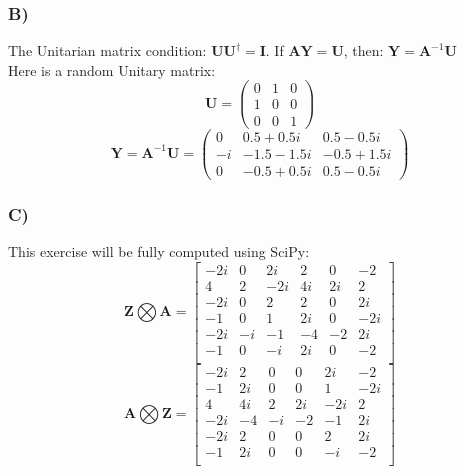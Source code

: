 \documentclass{article}
\begin{document}
            \subsubsection*{B)}
                The Unitarian matrix condition: $\mathbf{UU^{\dagger}} = \mathbf{I}$. If $\mathbf{AY} = \mathbf{U}$, then: $\mathbf{Y} = \mathbf{A}^{-1}\mathbf{U}$ \\
                Here is a random Unitary matrix:
                \[
                    \mathbf{U} = \begin{pmatrix}
                        0 & 1 & 0 \\
                        1 & 0 & 0 \\
                        0 & 0 & 1
                    \end{pmatrix}
                \]
                \[
                    \mathbf{Y} = \mathbf{A}^{-1}\mathbf{U} = 
                    \begin{pmatrix}
                    0 & 0.5 + 0.5i & 0.5 - 0.5i \\
                    -i & -1.5 - 1.5i & -0.5 + 1.5i \\
                    0 & -0.5 + 0.5i & 0.5 - 0.5i
                    \end{pmatrix}
                \]
            \subsubsection*{C)}
                This exercise will be fully computed using SciPy:
                \[
                    \mathbf{Z} \bigotimes \mathbf{A} = 
                    \begin{bmatrix}
                    -2i & 0 & 2i & 2 & 0 & -2 \\
                    4 & 2 & -2i & 4i & 2i & 2 \\
                    -2i & 0 & 2 & 2 & 0 & 2i \\
                    -1 & 0 & 1 & 2i & 0 & -2i \\
                    -2i & -i & -1 & -4 & -2 & 2i \\
                    -1 & 0 & -i & 2i & 0 & -2 \\
                    \end{bmatrix}
                \]
                \[
                    \mathbf{A} \bigotimes \mathbf{Z} = 
                    \begin{bmatrix}
                    -2i & 2 & 0 & 0 & 2i & -2 \\
                    -1 & 2i & 0 & 0 & 1 & -2i \\
                    4 & 4i & 2 & 2i & -2i & 2 \\
                    -2i & -4 & -i & -2 & -1 & 2i \\
                    -2i & 2 & 0 & 0 & 2 & 2i \\
                    -1 & 2i & 0 & 0 & -i & -2 \\
                    \end{bmatrix}
                \]

            
\end{document}
